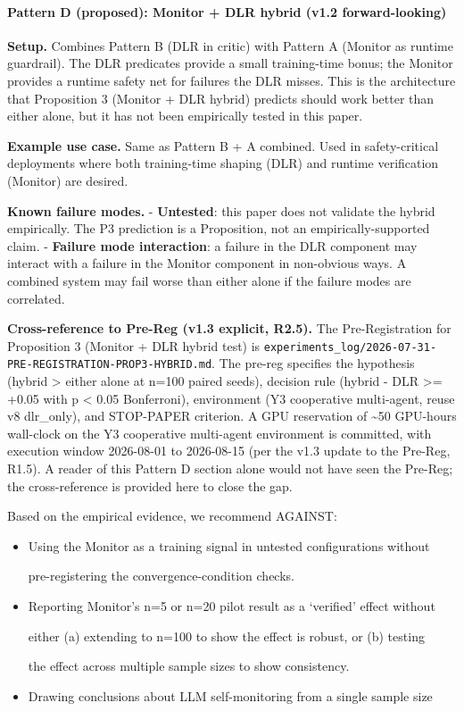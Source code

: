 \documentclass[11pt]{article}
\begin{document}
\paragraph{Pattern D (proposed): Monitor + DLR hybrid (v1.2
forward-looking)}\label{pattern-d-proposed-monitor-dlr-hybrid-v1.2-forward-looking}

\textbf{Setup.} Combines Pattern B (DLR in critic) with Pattern A
(Monitor as runtime guardrail). The DLR predicates provide a small
training-time bonus; the Monitor provides a runtime safety net for
failures the DLR misses. This is the architecture that Proposition 3
(Monitor + DLR hybrid) predicts should work better than either alone,
but it has not been empirically tested in this paper.

\textbf{Example use case.} Same as Pattern B + A combined. Used in
safety-critical deployments where both training-time shaping (DLR) and
runtime verification (Monitor) are desired.

\textbf{Known failure modes.} - \textbf{Untested}: this paper does not
validate the hybrid empirically. The P3 prediction is a Proposition, not
an empirically-supported claim. - \textbf{Failure mode interaction}: a
failure in the DLR component may interact with a failure in the Monitor
component in non-obvious ways. A combined system may fail worse than
either alone if the failure modes are correlated.

\textbf{Cross-reference to Pre-Reg (v1.3 explicit, R2.5).} The
Pre-Registration for Proposition 3 (Monitor + DLR hybrid test) is
\texttt{experiments\_log/2026-07-31-PRE-REGISTRATION-PROP3-HYBRID.md}.
The pre-reg specifies the hypothesis (hybrid \textgreater{} either alone
at n=100 paired seeds), decision rule (hybrid - DLR \textgreater= +0.05
with p \textless{} 0.05 Bonferroni), environment (Y3 cooperative
multi-agent, reuse v8 dlr\_only), and STOP-PAPER criterion. A GPU
reservation of \textasciitilde50 GPU-hours wall-clock on the Y3
cooperative multi-agent environment is committed, with execution window
2026-08-01 to 2026-08-15 (per the v1.3 update to the Pre-Reg, R1.5). A
reader of this Pattern D section alone would not have seen the Pre-Reg;
the cross-reference is provided here to close the gap.

Based on the empirical evidence, we recommend AGAINST:

\begin{itemize}
\item
  Using the Monitor as a training signal in untested configurations
  without

  pre-registering the convergence-condition checks.
\item
  Reporting Monitor's n=5 or n=20 pilot result as a `verified' effect
  without

  either (a) extending to n=100 to show the effect is robust, or (b)
  testing

  the effect across multiple sample sizes to show consistency.
\item
  Drawing conclusions about LLM self-monitoring from a single sample
  size
\end{itemize}
\end{document}

